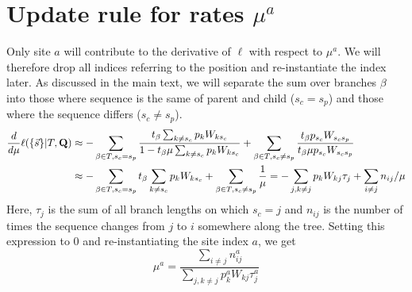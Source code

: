 \documentclass[aps,rmp,onecolumn]{revtex4}
\newcommand{\mat}[1]{{\bf #1}}
\newcommand{\eqp}{p}
\newcommand{\lh}{\ell}
\begin{document}
\section*{Update rule for rates $\mu^a$}
Only site $a$ will contribute to the derivative of $\lh$ with respect to $\mu^a$.
We will therefore drop all indices referring to the position and re-instantiate the index later.
As discussed in the main text, we will separate the sum over branches $\beta$ into those where sequence is the same of parent and child ($s_c=s_p$) and those where the sequence differs ($s_c\neq s_p$).
\begin{equation}
\begin{split}
	\frac{d}{d \mu} \lh (\{\vec{s}\} |T, \mat{Q}) &
	 \approx  -\sum_{\beta\in T,s_c=s_p} \frac{t_\beta \sum_{k\neq s_c} \eqp_{k} W_{k s_c}}{1 - t_\beta \mu \sum_{k\neq s_c} \eqp_k W_{ks_c}}
	 + \sum_{\beta\in T,s_c\neq s_p} \frac{t_\beta \eqp_{s_c} W_{s_cs_p}}{t_\beta \mu \eqp_{s_c} W_{s_c s_p}}\\
	 & \approx  -\sum_{\beta\in T,s_c=s_p} t_\beta \sum_{k\neq s_c} \eqp_{k} W_{k s_c} + \sum_{\beta\in T,s_c\neq s_p} \frac{1}{\mu} = - \sum_{j, k\neq j} \eqp_k W_{kj} \tau_j + \sum_{i\neq j} n_{ij}/\mu
\end{split}
\end{equation}
Here, $\tau_j$ is the sum of all branch lengths on which $s_c=j$ and $n_{ij}$ is the number of times the sequence changes from $j$ to $i$ somewhere along the tree.
Setting this expression to 0 and re-instantiating the site index $a$, we get
\begin{equation}
	\mu^a = \frac{\sum_{i\neq j} n^a_{ij}}{\sum_{j, k\neq j} \eqp^a_k W_{kj} \tau^a_j}
\end{equation}
\end{document}
